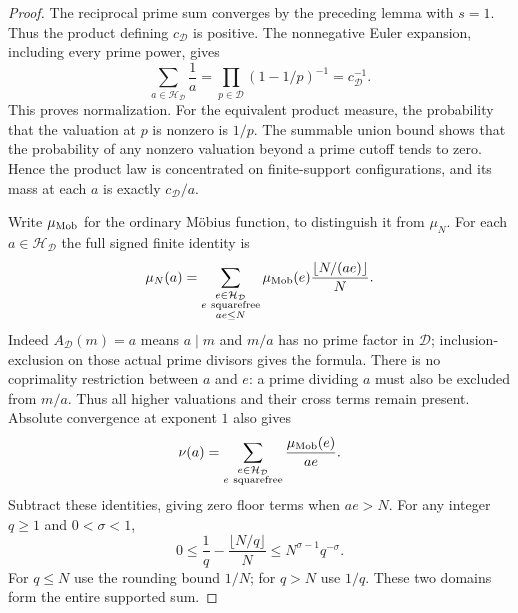 \documentclass[11pt]{article}
\theoremstyle{definition}
\begin{document}
\begin{proof}
The reciprocal prime sum converges by the preceding lemma with $s=1$.
Thus the product defining $c_{\mathcal D}$ is positive.
The nonnegative Euler expansion, including every prime power, gives
\[
 \sum_{a\in\mathcal H_{\mathcal D}}\frac1a
           =\prod_{p\in\mathcal D}(1-1/p)^{-1}
           =c_{\mathcal D}^{-1}.
\]
This proves normalization.
For the equivalent product measure, the probability that the
valuation at $p$ is nonzero is $1/p$.
The summable union bound shows that the probability of any nonzero
valuation beyond a prime cutoff tends to zero.
Hence the product law is concentrated on finite-support configurations,
and its mass at each $a$ is exactly $c_{\mathcal D}/a$.

Write $\mu_{\rm Mob}$ for the ordinary M\"obius function, to distinguish
it from $\mu_N$.
For each $a\in\mathcal H_{\mathcal D}$ the full signed finite identity is
\begin{equation}
 \mu_N(a)=
 \sum_{\substack{e\in\mathcal H_{\mathcal D}\\e\ {\rm squarefree}\\ae\le N}}
      \mu_{\rm Mob}(e)\frac{\lfloor N/(ae)\rfloor}{N}.
 \label{eq:deleted-component-exact-Mobius}
\end{equation}
Indeed $A_{\mathcal D}(m)=a$ means $a\mid m$ and $m/a$ has no
prime factor in $\mathcal D$; inclusion-exclusion on those actual
prime divisors gives the formula.
There is no coprimality restriction between $a$ and $e$:
a prime dividing $a$ must also be excluded from $m/a$.
Thus all higher valuations and their cross terms remain present.
Absolute convergence at exponent $1$ also gives
\[
 \nu(a)=
 \sum_{\substack{e\in\mathcal H_{\mathcal D}\\e\ {\rm squarefree}}}
                    \frac{\mu_{\rm Mob}(e)}{ae}.
\]
Subtract these identities, giving zero floor terms when $ae>N$.
For any integer $q\ge1$ and $0<\sigma<1$,
\[
 0\le \frac1q-\frac{\lfloor N/q\rfloor}{N}
          \le N^{\sigma-1}q^{-\sigma}.
\]
For $q\le N$ use the rounding bound $1/N$; for $q>N$ use $1/q$.
These two domains form the entire supported sum.


\end{proof}
\end{document}
